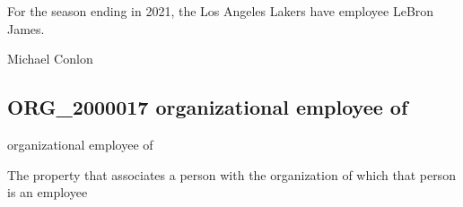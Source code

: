 \documentclass[letterpaper,10pt,english]{sphinxmanual}
\begin{document}
\begin{sphinxShadowBox}

\sphinxAtStartPar
For the season ending in 2021, the Los Angeles Lakers have employee LeBron James.
\end{sphinxShadowBox}

\begin{sphinxShadowBox}

\sphinxAtStartPar
{}
\end{sphinxShadowBox}

\begin{sphinxShadowBox}

\sphinxAtStartPar
Michael Conlon 
\end{sphinxShadowBox}
\begin{quote}

\ignorespaces \end{quote}


\subsection{ORG\_2000017 \sphinxhyphen{} organizational employee of}
\label{\detokenize{doc-ORG_2000017:org-2000017-organizational-employee-of}}\label{\detokenize{doc-ORG_2000017:index-0}}\label{\detokenize{doc-ORG_2000017::doc}}
\begin{sphinxShadowBox}

\sphinxAtStartPar
organizational employee of
\end{sphinxShadowBox}

\begin{sphinxShadowBox}

\sphinxAtStartPar
{}
\end{sphinxShadowBox}

\begin{sphinxShadowBox}

\sphinxAtStartPar
The property that associates a person with the organization of which that person is an employee
\end{sphinxShadowBox}
\end{document}
